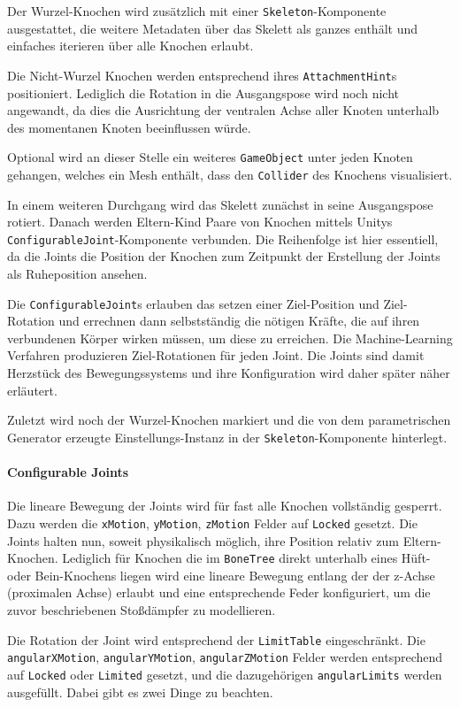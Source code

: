 Der Wurzel-Knochen wird zusätzlich mit einer \texttt{Skeleton}-Komponente ausgestattet, die weitere Metadaten über das Skelett als ganzes enthält und einfaches iterieren über alle Knochen erlaubt.

Die Nicht-Wurzel Knochen werden entsprechend ihres \texttt{Attachment\-Hint}s positioniert.
Lediglich die Rotation in die Ausgangspose wird noch nicht angewandt, da dies die Ausrichtung der ventralen Achse aller Knoten unterhalb des momentanen Knoten beeinflussen würde.

Optional wird an dieser Stelle ein weiteres \texttt{Game\-Object} unter jeden Knoten gehangen, welches ein Mesh enthält, dass den \texttt{Collider} des Knochens visualisiert.

In einem weiteren Durchgang wird das Skelett zunächst in seine Ausgangspose rotiert.
Danach werden Eltern-Kind Paare von Knochen mittels Unitys \texttt{Configurable\-Joint}-Komponente verbunden.
Die Reihenfolge ist hier essentiell, da die Joints die Position der Knochen zum Zeitpunkt der Erstellung der Joints als Ruheposition ansehen.

Die \texttt{Configurable\-Joint}s erlauben das setzen einer Ziel-Position und Ziel-Rotation und errechnen dann selbstständig die nötigen Kräfte, die auf ihren verbundenen Körper wirken müssen, um diese zu erreichen.
Die Machine-Learning Verfahren produzieren Ziel-Rotationen für jeden Joint.
Die Joints sind damit Herzstück des Bewegungssystems und ihre Konfiguration wird daher später näher erläutert.

Zuletzt wird noch der Wurzel-Knochen markiert und die von dem parametrischen Generator erzeugte Einstellungs-Instanz in der \texttt{Skeleton}-Komponente hinterlegt.

\paragraph{Configurable Joints}
Die lineare Bewegung der Joints wird für fast alle Knochen vollständig gesperrt.
Dazu werden die \texttt{xMotion}, \texttt{yMotion}, \texttt{zMotion} Felder auf \texttt{Locked} gesetzt.
Die Joints halten nun, soweit physikalisch möglich, ihre Position relativ zum Eltern-Knochen.
Lediglich für Knochen die im \texttt{BoneTree} direkt unterhalb eines Hüft- oder Bein-Knochens liegen wird eine lineare Bewegung entlang der der z-Achse (proximalen Achse) erlaubt und eine entsprechende Feder konfiguriert, um die zuvor beschriebenen Stoßdämpfer zu modellieren. 

Die Rotation der Joint wird entsprechend der \texttt{Limit\-Table} eingeschränkt.
Die \texttt{angular\-XMotion}, \texttt{angular\-YMotion}, \texttt{angular\-ZMotion} Felder werden entsprechend auf \texttt{Locked} oder \texttt{Limited} gesetzt, und die dazugehörigen \texttt{angularLimits} werden ausgefüllt.
Dabei gibt es zwei Dinge zu beachten.

